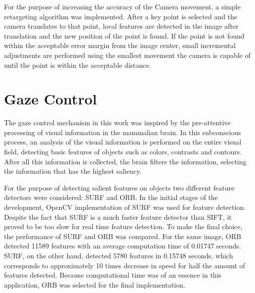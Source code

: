 \documentclass{l4proj}
\begin{document}
For the purpose of increasing the accuracy of the Camera movement, a simple retargeting algorithm was implemented. After a key point is selected and the camera translates to that point, local features are detected in the image after translation and the new position of the point is found. If the point is not found within the acceptable error margin from the image center, small incremental adjustments are performed using the smallest movement the camera is capable of until the point is within the acceptable distance. 



\section{Gaze Control}


The gaze control mechanism in this work was inspired by the pre-attentive processing of visual information in the mammalian brain. In this subconscious process, an analysis of the visual information is performed on the entire visual field, detecting basic features of objects such as colors, contrasts and contours. After all this information is collected, the brain filters the information, selecting the information that has the highest saliency. 



For the purpose of detecting salient features on objects two different feature detectors were considered: SURF and ORB. In the initial stages of the development, OpenCV implementation of SURF was used for feature detection. Despite the fact that SURF is a much faster feature detector than SIFT, it proved to be too slow for real time feature detection. To make the final choice, the performance of SURF and ORB was compared. For the same image, ORB detected 11589 features with an average computation time of 0.01747 seconds. SURF, on the other hand, detected 5780 features in 0.15748 seconds, which corresponds to approximately 10 times decrease in speed for half the amount of features detected. Because computational time was of an essence in this application, ORB was selected for the final implementation. 
\end{document}

